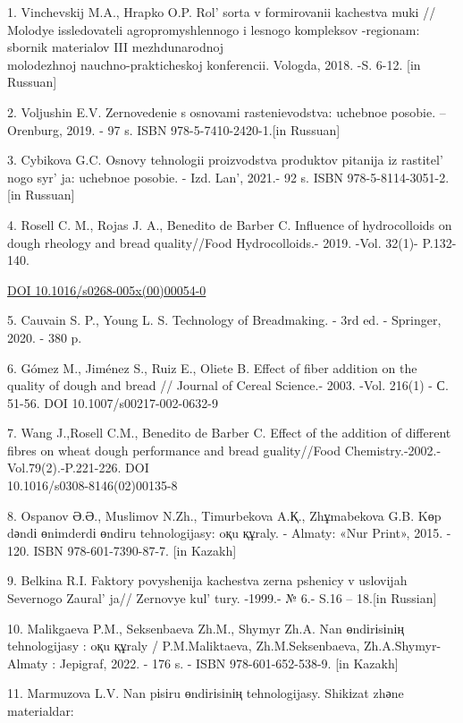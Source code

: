 \begin{references}
1. Vinchevskij M.A., Hrapko O.P. Rol'{} sorta v
formirovanii kachestva muki // Molodye issledovateli agropromyshlennogo
i lesnogo kompleksov -regionam: sbornik materialov III mezhdunarodnoj\\
molodezhnoj nauchno-prakticheskoj konferencii. Vologda, 2018. -S. 6-12.
{[}in Russuan{]}

2. Voljushin E.V. Zernovedenie s osnovami rastenievodstva: uchebnoe
posobie. -- Orenburg, 2019. - 97 s. ISBN 978-5-7410-2420-1.{[}in
Russuan{]}

3. Cybikova G.C. Osnovy tehnologii proizvodstva produktov pitanija iz
rastitel' nogo syr' ja: uchebnoe posobie.
- Izd. Lan', 2021.- 92 s. ISBN 978-5-8114-3051-2. {[}in
Russuan{]}

4. Rosell C. M., Rojas J. A., Benedito de Barber C. Influence of
hydrocolloids on dough rheology and bread quality//Food Hydrocolloids.-
2019. -Vol. 32(1)- P.132-140.

\href{https://doi.org/10.1016/s0268-005x(00)00054-0}{DOI
10.1016/s0268-005x(00)00054-0}

5. Cauvain S. P., Young L. S. Technology of Breadmaking. - 3rd ed. -
Springer, 2020. - 380 p.

6. Gómez M., Jiménez S., Ruiz E., Oliete B. Effect of fiber addition on
the quality of dough and bread // Journal of Cereal Science.- 2003.
-Vol. 216(1) - С. 51-56. DOI 10.1007/s00217-002-0632-9

7. Wang J.,Rosell C.M., Benedito de Barber C. Effect of the addition of
different fibres on wheat dough performance and bread guality//Food
Chemistry.-2002.-Vol.79(2).-P.221-226. DOI \\10.1016/s0308-8146(02)00135-8

8. Ospanov Ә.Ә., Muslimov N.Zh., Timurbekova A.Қ., Zhұmabekova G.B. Kөp
dәndі өnіmderdі өndіru tehnologijasy: oқu құraly. - Almaty: «Nur Print»,
2015. - 120. ISBN 978-601-7390-87-7. {[}in Kazakh{]}

9. Belkina R.I. Faktory povyshenija kachestva zerna pshenicy v uslovijah
Severnogo Zaural' ja// Zernovye kul' tury.
-1999.- № 6.- S.16 -- 18.{[}in Russian{]}

10. Malikgaeva P.M., Seksenbaeva Zh.M., Shymyr Zh.A. Nan өndіrіsіnің
tehnologijasy : oқu құraly / P.M.Maliktaeva, Zh.M.Seksenbaeva,
Zh.A.Shymyr- Almaty : Jepigraf, 2022. - 176 s. - ISBN 978-601-652-538-9.
{[}in Kazakh{]}

11. Marmuzova L.V. Nan pіsіru өndіrіsіnің tehnologijasy. Shikіzat zhәne
materialdar:


\end{references}
